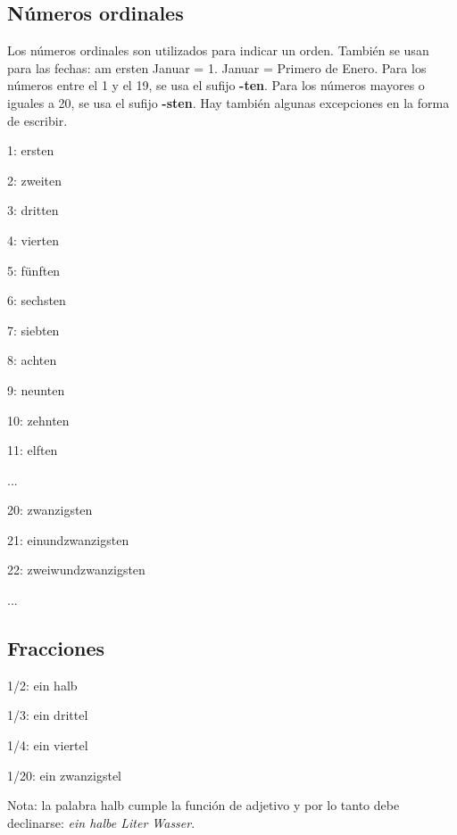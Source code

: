 \subsection{Números ordinales}
Los números ordinales son utilizados para indicar un orden. También se usan para las fechas: am ersten Januar = 1. Januar = Primero de Enero. Para los números entre el 1 y el 19, se usa el sufijo \textbf{-ten}. Para los números mayores o iguales a 20, se usa el sufijo \textbf{-sten}. Hay también algunas excepciones en la forma de escribir.
\begin{multicols}{2}
\begin{myitemize}
\item 1: ersten
\item 2: zweiten
\item 3: dritten
\item 4: vierten
\item 5: fünften
\item 6: sechsten
\item 7: siebten
\item 8: achten
\item 9: neunten
\item 10: zehnten
\item 11: elften
\item ...
\item 20: zwanzigsten
\item 21: einundzwanzigsten
\item 22: zweiwundzwanzigsten
\item ...
\end{myitemize}
\end{multicols}

\subsection{Fracciones}
\begin{multicols}{2}
\begin{myitemize}
\item 1/2: ein halb
\item 1/3: ein drittel
\item 1/4: ein viertel
\item 1/20: ein zwanzigstel
\end{myitemize}
\end{multicols}
Nota: la palabra halb cumple la función de adjetivo y por lo tanto debe declinarse: \textit{ein halbe Liter Wasser}.

